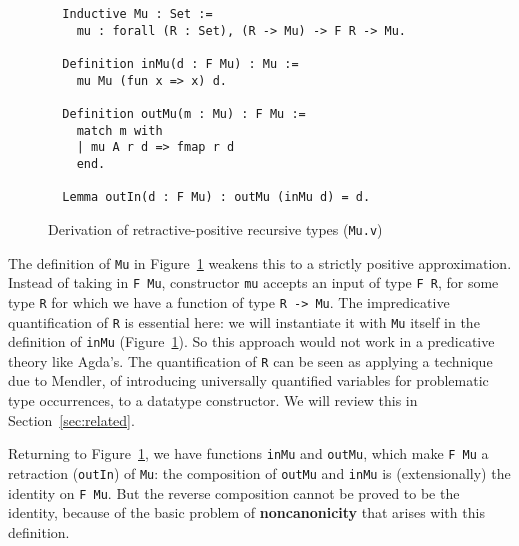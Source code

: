 \documentclass[a4paper,USenglish]{lipics-v2021}
\begin{document}
\begin{figure}
\begin{verbatim}
  Inductive Mu : Set :=
    mu : forall (R : Set), (R -> Mu) -> F R -> Mu.

  Definition inMu(d : F Mu) : Mu :=
    mu Mu (fun x => x) d.

  Definition outMu(m : Mu) : F Mu :=
    match m with
    | mu A r d => fmap r d
    end.

  Lemma outIn(d : F Mu) : outMu (inMu d) = d.
\end{verbatim}
\caption{Derivation of retractive-positive recursive types (\texttt{Mu.v})}
\label{fig:mu}
\end{figure}


The definition of \verb|Mu| in Figure~\ref{fig:mu} weakens
this to a strictly positive approximation. Instead of taking in \verb|F Mu|, constructor \verb|mu|
accepts an input of type \verb|F R|, for some type \verb|R| for which
we have a function of type \verb|R -> Mu|.  The impredicative
quantification of \verb|R| is essential here: we will instantiate it with
\verb|Mu| itself in the definition of \verb|inMu|
(Figure~\ref{fig:mu}).  So this approach would not work in a
predicative theory like Agda's.  The quantification of \verb|R| can be
seen as applying a technique due to Mendler, of introducing
universally quantified variables for problematic type occurrences, to
a datatype constructor.  We will review this in
Section~\ref{sec:related}.

Returning to Figure~\ref{fig:mu}, we have functions \verb|inMu| and
\verb|outMu|, which make \verb|F Mu| a retraction (\verb|outIn|) of
\verb|Mu|: the composition of \verb|outMu| and \verb|inMu| is
(extensionally) the identity on \verb|F Mu|.  But the reverse
composition cannot be proved to be the identity, because of the basic
problem of \textbf{noncanonicity} that arises with this definition.
\end{document}
